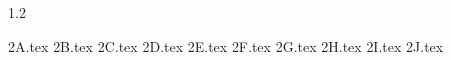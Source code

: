 \begin{spacing} {1.2}


{2A.tex}
{2B.tex}
{2C.tex}
{2D.tex}
{2E.tex}
{2F.tex}
{2G.tex}
{2H.tex}
{2I.tex}
{2J.tex}

\end{spacing}


